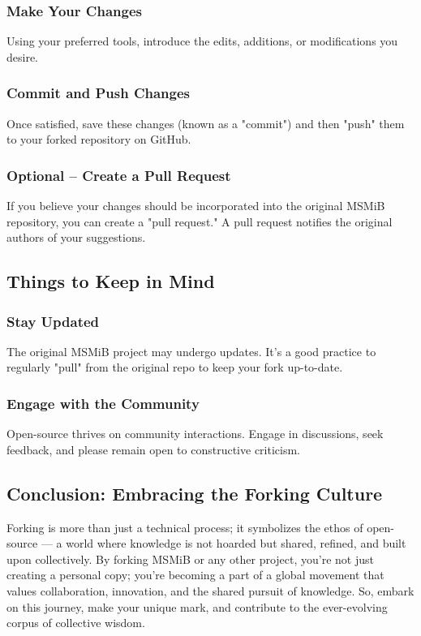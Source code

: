 \documentclass{book}
\begin{document}
\subsubsection*{Make Your Changes}
Using your preferred tools, introduce the edits, additions, or modifications you desire.

\subsubsection*{Commit and Push Changes}
Once satisfied, save these changes (known as a "commit") and then "push" them to your forked repository on GitHub.

\subsubsection*{Optional – Create a Pull Request}
If you believe your changes should be incorporated into the original MSMiB repository, you can create a "pull request." A pull request notifies the original authors of your suggestions.

\subsection*{Things to Keep in Mind}
\subsubsection*{Stay Updated}
The original MSMiB project may undergo updates. It's a good practice to regularly "pull" from the original repo to keep your fork up-to-date.

\subsubsection*{Engage with the Community}
Open-source thrives on community interactions. Engage in discussions, seek feedback, and please remain open to constructive criticism.

\subsection*{Conclusion: Embracing the Forking Culture}
Forking is more than just a technical process; it symbolizes the ethos of open-source — a world where knowledge is not hoarded but shared, refined, and built upon collectively. By forking MSMiB or any other project, you're not just creating a personal copy; you're becoming a part of a global movement that values collaboration, innovation, and the shared pursuit of knowledge. So, embark on this journey, make your unique mark, and contribute to the ever-evolving corpus of collective wisdom.
\end{document}

